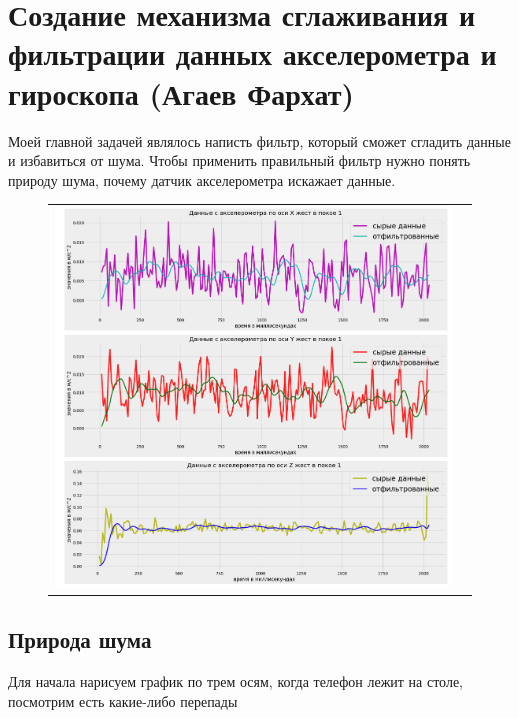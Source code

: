 \section{Создание механизма 
сглаживания и фильтрации данных акселерометра и 
гироскопа (Агаев Фархат)}

Моей главной задачей являлось написть фильтр, 
который сможет сгладить данные и избавиться от шума.
Чтобы применить правильный фильтр нужно понять природу шума, 
почему датчик акселерометра искажает данные.
\begin{figure}[H]
    \begin{center}
        \begin{tabular}{cc}
            \includegraphics[width=1\textwidth]{farim/relax} & 
        \end{tabular}
    \end{center}
\end{figure}

\subsection{Природа шума}
Для начала нарисуем график по трем осям, 
когда телефон лежит на столе, посмотрим есть какие-либо перепады

